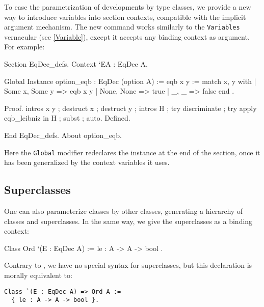 \label{SectionContext}
To ease the parametrization of developments by type classes, we provide
a new way to introduce variables into section contexts, compatible with 
the implicit argument mechanism. 
The new command works similarly to the \texttt{Variables} vernacular
(see \ref{Variable}), except it accepts any binding context as argument.
For example:

\begin{coq_example}
Section EqDec_defs.
  Context `{EA : EqDec A}.
\end{coq_example}

\begin{coq_example*}
  Global Instance option_eqb : EqDec (option A) :=
  { eqb x y := match x, y with
    | Some x, Some y => eqb x y
    | None, None => true
    | _, _ => false
    end }.
\end{coq_example*}
\begin{coq_eval}
Proof.
intros x y ; destruct x ; destruct y ; intros H ; 
try discriminate ; try apply eqb_leibniz in H ;
subst ; auto. 
Defined.
\end{coq_eval}

\begin{coq_example}
End EqDec_defs.
About option_eqb.
\end{coq_example}

Here the \texttt{Global} modifier redeclares the instance at the end of 
the section, once it has been generalized by the context variables it uses.


\subsection{Superclasses}
\label{classes:superclasses}
One can also parameterize classes by other classes, generating a
hierarchy of classes and superclasses. In the same way, we give the
superclasses as a binding context:

\begin{coq_example*}
Class Ord `(E : EqDec A) :=
  { le : A -> A -> bool }.
\end{coq_example*}

Contrary to \Haskell, we have no special syntax for superclasses, but
this declaration is morally equivalent to:
\begin{verbatim}
Class `(E : EqDec A) => Ord A :=
  { le : A -> A -> bool }.
\end{verbatim}

